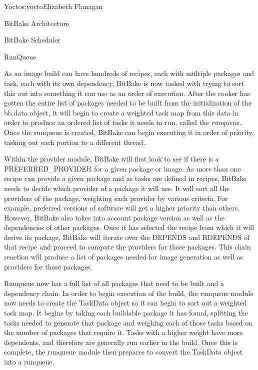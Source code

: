 \begin{aosachapter}{Yocto}{s:yocto}{Elizabeth Flanagan}
\begin{aosasect1}{BitBake Architecture}
\begin{aosasect2}{BitBake Scheduler}
\begin{aosasect3}{RunQueue}

As an image build can have hundreds of recipes, each with multiple
packages and task, each with its own dependency, BitBake is now
tasked with trying to sort this out into something it can use as an
order of execution. After the cooker has gotten the entire list
of packages needed to be built from the initialization of the bb.data
object, it will begin to create a weighted task map from this data in
order to produce an ordered list of tasks it needs to run, called
the \emph{runqueue}. Once the runqueue is created, BitBake can begin
executing it in order of priority, tasking out each portion to a
different thread.

Within the provider module, BitBake will first look to see if there is
a PREFERRED\_PROVIDER for a given package or image. As more than one
recipe can provide a given package and as tasks are defined in
recipes, BitBake needs to decide which provider of a package it will
use. It will sort all the providers of the package, weighting each
provider by various criteria. For example, preferred versions of
software will get a higher priority than others. However, BitBake also
takes into account package version as well as the dependencies of
other packages. Once it has selected the recipe from which it will
derive its package, BitBake will iterate over the DEPENDS and RDEPENDS
of that recipe and proceed to compute the providers for those
packages. This chain reaction will produce a list of packages needed
for image generation as well as providers for those packages.

Runqueue now has a full list of all packages that need to be built and a
dependency chain. In order to begin execution of the build, the
runqueue module now needs to create the TaskData object so it can
begin to sort out a weighted task map. It begins by taking each
buildable package it has found, splitting the tasks needed to
generate that package and weighing each of those tasks based on the
number of packages that require it. Tasks with a higher weight have
more dependents, and therefore are generally run earlier in the
build. Once this is complete, the runqueue module then prepares to
convert the TaskData object into a runqueue.


\end{aosasect3}
\end{aosasect2}
\end{aosasect1}
\end{aosachapter}
